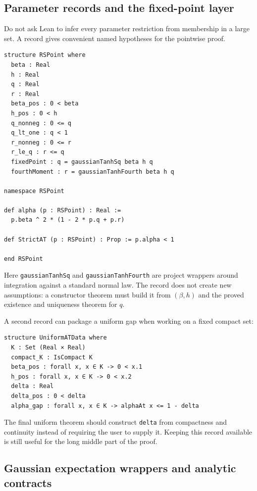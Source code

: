 \documentclass[11pt]{article}
\numberwithin{equation}{section}
\newcommand{\1}{\mathbf 1}
\begin{document}
\subsection{Parameter records and the fixed-point layer}

Do not ask Lean to infer every parameter restriction from membership in a
large set.  A record gives convenient named hypotheses for the pointwise
proof.
\begin{lstlisting}
structure RSPoint where
  beta : Real
  h : Real
  q : Real
  r : Real
  beta_pos : 0 < beta
  h_pos : 0 < h
  q_nonneg : 0 <= q
  q_lt_one : q < 1
  r_nonneg : 0 <= r
  r_le_q : r <= q
  fixedPoint : q = gaussianTanhSq beta h q
  fourthMoment : r = gaussianTanhFourth beta h q

namespace RSPoint

def alpha (p : RSPoint) : Real :=
  p.beta ^ 2 * (1 - 2 * p.q + p.r)

def StrictAT (p : RSPoint) : Prop := p.alpha < 1

end RSPoint
\end{lstlisting}
Here \texttt{gaussianTanhSq} and \texttt{gaussianTanhFourth} are project
wrappers around integration against a standard normal law.  The record does
not create new assumptions: a constructor theorem must build it from
$(\beta,h)$ and the proved existence and uniqueness theorem for $q$.

A second record can package a uniform gap when working on a fixed compact
set:
\begin{lstlisting}
structure UniformATData where
  K : Set (Real × Real)
  compact_K : IsCompact K
  beta_pos : forall x, x ∈ K -> 0 < x.1
  h_pos : forall x, x ∈ K -> 0 < x.2
  delta : Real
  delta_pos : 0 < delta
  alpha_gap : forall x, x ∈ K -> alphaAt x <= 1 - delta
\end{lstlisting}
The final uniform theorem should construct \texttt{delta} from compactness
and continuity instead of requiring the user to supply it.  Keeping this
record available is still useful for the long middle part of the proof.

\subsection{Gaussian expectation wrappers and analytic contracts}
\end{document}
